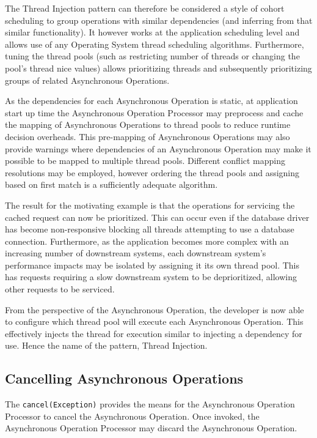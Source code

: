 \documentclass[prodmode]{style/acmlarge}
\begin{document}
The Thread Injection pattern can therefore be considered a style of cohort
scheduling \cite{cohort} to group operations with similar dependencies (and
inferring from that similar functionality).  It however works at the application
scheduling level and allows use of any Operating System thread scheduling
algorithms.  Furthermore, tuning the thread pools (such as restricting number of
threads or changing the pool's thread nice values) allows prioritizing threads
and subsequently prioritizing groups of related Asynchronous Operations.

As the dependencies for each Asynchronous Operation is static, at application
start up time the Asynchronous Operation Processor may preprocess and cache the
mapping of Asynchronous Operations to thread pools to reduce runtime decision
overheads.  This pre-mapping of Asynchronous Operations may also provide
warnings where dependencies of an Asynchronous Operation may make it possible to
be mapped to multiple thread pools.  Different conflict mapping resolutions may
be employed, however ordering the thread pools and assigning based on first
match is a sufficiently adequate algorithm.

The result for the motivating example is that the operations for servicing the
cached request can now be prioritized.  This can occur even if the database
driver has become non-responsive blocking all threads attempting to use a
database connection.  Furthermore, as the application becomes more complex with
an increasing number of downstream systems, each downstream system's performance
impacts may be isolated by assigning it its own thread pool.  This has requests
requiring a slow downstream system to be deprioritized, allowing other requests
to be serviced.

From the perspective of the Asynchronous Operation, the developer is now able to
configure which thread pool will execute each Asynchronous Operation.  This
effectively injects the thread for execution similar to injecting a dependency
for use.  Hence the name of the pattern, Thread Injection.


\subsection{Cancelling Asynchronous Operations}

The \texttt{cancel(Exception)} provides the means for the Asynchronous Operation
Processor to cancel the Asynchronous Operation.  Once invoked, the Asynchronous
Operation Processor may discard the Asynchronous Operation.
\end{document}

